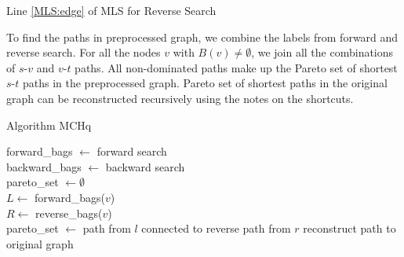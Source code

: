 \vskip 5mm

\begin{algorithm}[H]
    \SetAlgoLined
    \caption{Line \ref{MLS:edge} of MLS for Reverse Search}
    \label{MCHqr}
\end{algorithm}

To find the paths in preprocessed graph, we combine the labels from forward and reverse search. 
For all the nodes $v$ with $B(v) \ne \emptyset$, we join all the combinations of $s$-$v$ and $v$-$t$ paths. 
All non-dominated paths make up the Pareto set of shortest $s$-$t$ paths in the preprocessed graph.
Pareto set of shortest paths in the original graph can be reconstructed recursively using the notes on the shortcuts.

\begin{algorithm}[H]
    \SetAlgoLined
    \caption{Algorithm MCHq}
    \label{MCHq}
    forward\_bags $\leftarrow$ forward search \\
    backward\_bags $\leftarrow$ backward search \\
    pareto\_set $\leftarrow \emptyset$ \\
     {
        $L \leftarrow $ forward\_bags($v$) \\
        $R \leftarrow $ reverse\_bags($v$) \\
         {
             {
                pareto\_set $\leftarrow$ path from $l$ connected to reverse path from $r$
            }
        }
    }
     {
        reconstruct path to original graph
    }
\end{algorithm}
